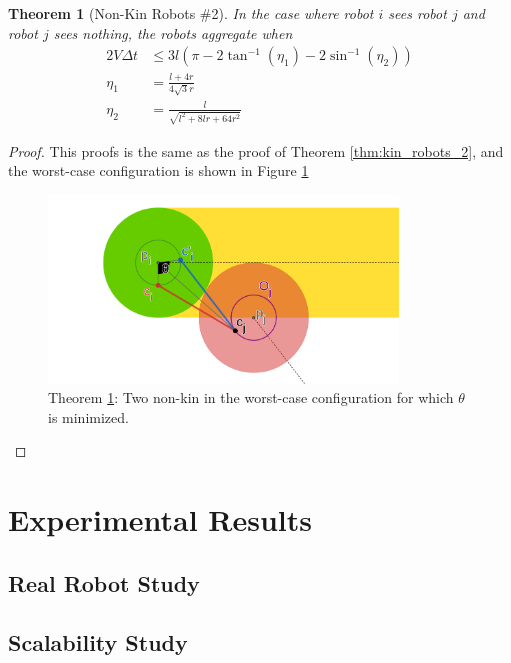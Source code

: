 \documentclass[letterpaper, 10 pt, conference]{ieeeconf}
\newtheorem{theorem}{Theorem}
\begin{document}
\begin{theorem}[Non-Kin Robots \#2]\label{thm:non_kin_robots_2}
  In the case where robot $i$ sees robot $j$ and robot $j$ sees nothing, the robots aggregate when
  \begin{equation}\label{eq:two_non_kin_condition}
    \begin{split}
      2V\Delta t &\leq 3l( \pi - 2\tan^{-1}(\eta_1) - 2\sin^{-1}(\eta_2)) \\
      \eta_1 &= \frac{l+4r}{4\sqrt{3}r} \\
      \eta_2 &= \frac{l}{\sqrt{l^2+8lr+64r^2}}
    \end{split}
  \end{equation}
\end{theorem}
\begin{proof}

  This proofs is the same as the proof of Theorem \ref{thm:kin_robots_2}, and the worst-case configuration is shown in Figure \ref{fig:non_kin_aggregation_2_worst_case}

  \begin{figure}[t]
    \centering
    \includegraphics[height=5cm]{./images/non_kin_aggregation_2_worst_case.png}
    \caption{Theorem \ref{thm:non_kin_robots_2}: Two non-kin in the worst-case configuration for which $\theta$ is minimized.}
    \label{fig:non_kin_aggregation_2_worst_case}
  \end{figure}

\end{proof}

\section{Experimental Results}

\subsection{Real Robot Study} \label{section:real_robots}
\subsection{Scalability Study} \label{section:scalability}
\end{document}
